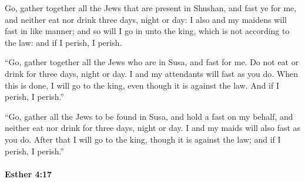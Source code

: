 			\begin{versebox}
					\item[BHS] 
					\item[LXX] 
					\item[ASV] Go, gather together all the Jews that are present in Shushan, and fast ye for me, and neither eat nor drink three days, night or day: I also and my maidens will fast in like manner; and so will I go in unto the king, which is not according to the law: and if I perish, I perish.
					\item[NIV] “Go, gather together all the Jews who are in Susa, and fast for me. Do not eat or drink for three days, night or day. I and my attendants will fast as you do. When this is done, I will go to the king, even though it is against the law. And if I perish, I perish.”
					\item[NRSV] “Go, gather all the Jews to be found in Susa, and hold a fast on my behalf, and neither eat nor drink for three days, night or day. I and my maids will also fast as you do. After that I will go to the king, though it is against the law; and if I perish, I perish.”
			\end{versebox}

		\paragraph{Esther 4:17} %
			\label{ESTHER-4-17}

